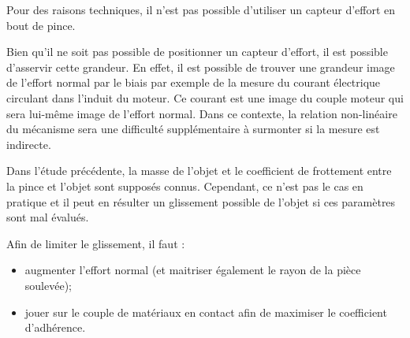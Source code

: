 Pour des raisons techniques, il n'est pas possible d'utiliser un capteur d'effort en bout de pince.

\ifprof
\begin{corrige}
Bien qu’il ne soit pas possible de positionner un capteur d’effort, il est possible d’asservir cette grandeur. En effet, il est possible de trouver une grandeur image de l’effort normal par le biais par exemple de la mesure du courant électrique circulant dans l’induit du moteur. Ce courant est une image du couple moteur qui sera lui-même image de l’effort normal. Dans ce contexte, la relation non-linéaire du mécanisme sera une difficulté supplémentaire à surmonter si la mesure est indirecte.
\end{corrige}
\else
\fi

Dans l'étude précédente, la masse de l'objet et le coefficient de frottement entre la pince et l'objet
sont supposés connus. Cependant, ce n’est pas le cas en pratique et il peut en résulter un
glissement possible de l’objet si ces paramètres sont mal évalués.

\ifprof
\begin{corrige}
Afin de limiter le glissement, il faut :
\begin{itemize}
\item augmenter l’effort normal (et maitriser également le rayon de la pièce soulevée);
\item jouer sur le couple de matériaux en contact afin de maximiser le coefficient d’adhérence.
\end{itemize}

\end{corrige}
\else
\fi

